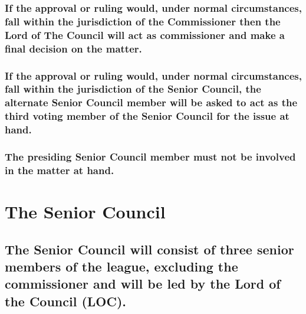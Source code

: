 \documentclass[]{book}
\begin{document}
\hypertarget{if-the-approval-or-ruling-would-under-normal-circumstances-fall-within-the-jurisdiction-of-the-commissioner-then-the-lord-of-the-council-will-act-as-commissioner-and-make-a-final-decision-on-the-matter.}{%
\subsubsection{If the approval or ruling would, under normal circumstances, fall within the jurisdiction of the Commissioner then the Lord of The Council will act as commissioner and make a final decision on the matter.}\label{if-the-approval-or-ruling-would-under-normal-circumstances-fall-within-the-jurisdiction-of-the-commissioner-then-the-lord-of-the-council-will-act-as-commissioner-and-make-a-final-decision-on-the-matter.}}

\hypertarget{if-the-approval-or-ruling-would-under-normal-circumstances-fall-within-the-jurisdiction-of-the-senior-council-the-alternate-senior-council-member-will-be-asked-to-act-as-the-third-voting-member-of-the-senior-council-for-the-issue-at-hand.}{%
\subsubsection{If the approval or ruling would, under normal circumstances, fall within the jurisdiction of the Senior Council, the alternate Senior Council member will be asked to act as the third voting member of the Senior Council for the issue at hand.}\label{if-the-approval-or-ruling-would-under-normal-circumstances-fall-within-the-jurisdiction-of-the-senior-council-the-alternate-senior-council-member-will-be-asked-to-act-as-the-third-voting-member-of-the-senior-council-for-the-issue-at-hand.}}

\hypertarget{the-presiding-senior-council-member-must-not-be-involved-in-the-matter-at-hand.}{%
\subsubsection{The presiding Senior Council member must not be involved in the matter at hand.}\label{the-presiding-senior-council-member-must-not-be-involved-in-the-matter-at-hand.}}

\hypertarget{the-senior-council}{%
\section{The Senior Council}\label{the-senior-council}}

\hypertarget{the-senior-council-will-consist-of-three-senior-members-of-the-league-excluding-the-commissioner-and-will-be-led-by-the-lord-of-the-council-loc.}{%
\subsection{The Senior Council will consist of three senior members of the league, excluding the commissioner and will be led by the Lord of the Council (LOC).}\label{the-senior-council-will-consist-of-three-senior-members-of-the-league-excluding-the-commissioner-and-will-be-led-by-the-lord-of-the-council-loc.}}
\end{document}
